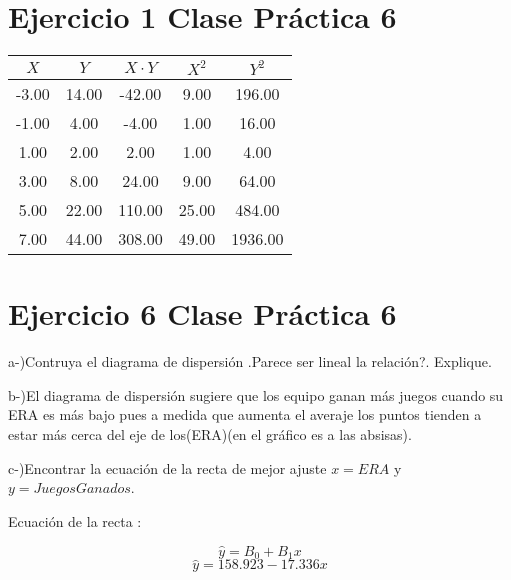 \documentclass{article}
\begin{document}
	\section*{Ejercicio 1 Clase Pr\'actica 6 }
	
	\begin{table}[ht]
		\centering		
		\begin{tabular}{|ccccc|}
			\hline
			\rowcolor[gray]{0.8} $X$ & $Y$ & $X\cdot Y$ & $X^2$ & $Y^2$ \\ 
			\hline
			-3.00 & 14.00 & -42.00 & 9.00 & 196.00 \\ 
			-1.00 & 4.00 & -4.00 & 1.00 & 16.00 \\ 
			1.00 & 2.00 & 2.00 & 1.00 & 4.00 \\ 
			3.00 & 8.00 & 24.00 & 9.00 & 64.00 \\ 
			5.00 & 22.00 & 110.00 & 25.00 & 484.00 \\ 
			\hline
			\rowcolor[gray]{0.9} 7.00 & 44.00 & 308.00 & 49.00 & 1936.00 \\ 
			\hline
		\end{tabular}
	\end{table}
	
	\section*{Ejercicio 6 Clase Pr\'actica 6 }

		\begin{flushleft}
			a-)Contruya el diagrama de dispersi\'on .Parece ser lineal la relaci\'on?. Explique.
		\end{flushleft}

		\begin{flushleft}
			b-)El diagrama de dispersi\'on sugiere que los equipo ganan m\'as juegos cuando su ERA es m\'as bajo pues a medida que aumenta el averaje los puntos tienden a estar m\'as cerca del eje de los(ERA)(en el gr\'afico es a las absisas).
		\end{flushleft}

		\begin{flushleft}
			c-)Encontrar la ecuaci\'on de la recta de mejor ajuste $x = ERA$ y $y = Juegos Ganados$.
		\end{flushleft}

		\begin{flushleft}
			Ecuaci\'on de la recta :
		\end{flushleft}
		$$ \hat y = B_{0} + B_{1}x$$
		$$ \hat y = 158.923 - 17.336 x$$
\end{document}
